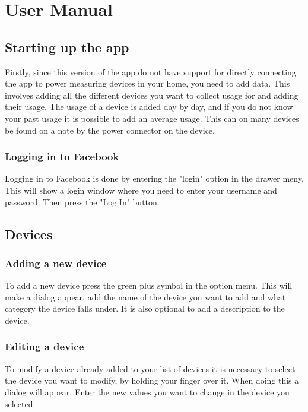 \chapter{User Manual}


\section{Starting up the app}
Firstly, since this version of the app do not have support for directly connecting the app to power measuring devices in your home, you need to add data. This involves adding all the different devices you want to collect usage for and adding their usage. The usage of a device is added day by day, and if you do not know your past usage it is possible to add an average usage. This can on many devices be found on a note by the power connector on the device.

\subsection{Logging in to Facebook}
Logging in to Facebook is done by entering the "login" option in the drawer meny. This will show a login window where you need to enter your username and password. Then press the "Log In" button. 

\label{sec:devices}
\section{Devices}
\subsection{Adding a new device}
To add a new device press the green plus symbol in the option menu. This will make a dialog appear, add the name of the device you want to add and what category the device falls under. It is also optional to add a description to the device.

\subsection{Editing a device}
To modify a device already added to your list of devices it is necessary to select the device you want to modify, by holding your finger over it. When doing this a dialog will appear. Enter the new values you want to change in the device you selected. 
